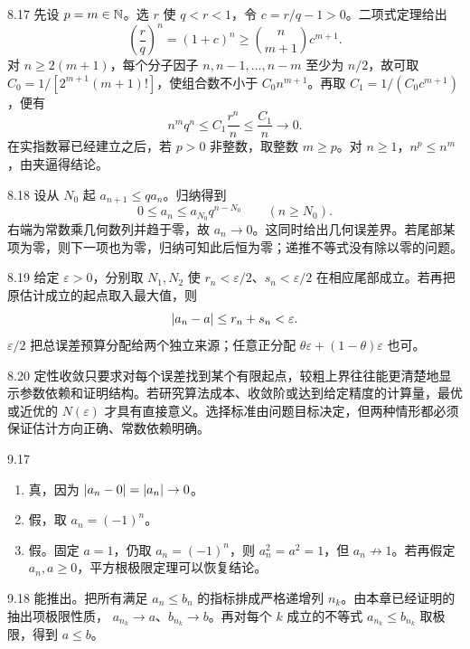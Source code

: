 \begin{solution}{8.17}
先设 \(p=m\in\mathbb{N}\)。选 \(r\) 使 \(q<r<1\)，令 \(c=r/q-1>0\)。二项式定理给出
\[
 \left(\frac rq\right)^n=(1+c)^n
 \ge\binom n{m+1}c^{m+1}.
\]
对 \(n\ge2(m+1)\)，每个分子因子 \(n,n-1,\ldots,n-m\) 至少为 \(n/2\)，故可取 \(C_0=1/[2^{m+1}(m+1)!]\)，使组合数不小于 \(C_0n^{m+1}\)。再取 \(C_1=1/(C_0c^{m+1})\)，便有
\[
 n^mq^n\le C_1\frac{r^n}{n}\le\frac{C_1}{n}\to0.
\]
在实指数幂已经建立之后，若 \(p>0\) 非整数，取整数 \(m\ge p\)。对 \(n\ge1\)，\(n^p\le n^m\)，由夹逼得结论。
\end{solution}

\begin{solution}{8.18}
设从 \(N_0\) 起 \(a_{n+1}\le qa_n\)。归纳得到
\[
 0\le a_n\le a_{N_0}q^{n-N_0}\qquad(n\ge N_0).
\]
右端为常数乘几何数列并趋于零，故 \(a_n\to0\)。这同时给出几何误差界。若尾部某项为零，则下一项也为零，归纳可知此后恒为零；递推不等式没有除以零的问题。
\end{solution}

\begin{solution}{8.19}
给定 \(\varepsilon>0\)，分别取 \(N_1,N_2\) 使
\(r_n<\varepsilon/2\)、\(s_n<\varepsilon/2\) 在相应尾部成立。若再把原估计成立的起点取入最大值，则
\[
 \left|a_n-a\right|\le r_n+s_n<\varepsilon.
\]
\(\varepsilon/2\) 把总误差预算分配给两个独立来源；任意正分配 \(\theta\varepsilon+(1-\theta)\varepsilon\) 也可。
\end{solution}

\begin{solution}{8.20}
定性收敛只要求对每个误差找到某个有限起点，较粗上界往往能更清楚地显示参数依赖和证明结构。若研究算法成本、收敛阶或达到给定精度的计算量，最优或近优的 \(N(\varepsilon)\) 才具有直接意义。选择标准由问题目标决定，但两种情形都必须保证估计方向正确、常数依赖明确。
\end{solution}

\begin{solution}{9.17}
\begin{enumerate}[label=(\arabic*)]
 \item 真，因为 \(\left|a_n-0\right|=\left|a_n\right|\to0\)。
 \item 假，取 \(a_n=(-1)^n\)。
 \item 假。固定 \(a=1\)，仍取 \(a_n=(-1)^n\)，则 \(a_n^2=a^2=1\)，但 \(a_n\not\to1\)。若再假定 \(a_n,a\ge0\)，平方根极限定理可以恢复结论。
\end{enumerate}
\end{solution}

\begin{solution}{9.18}
能推出。把所有满足 \(a_n\le b_n\) 的指标排成严格递增列 \(n_k\)。由本章已经证明的抽出项极限性质，
\(a_{n_k}\to a\)、\(b_{n_k}\to b\)。再对每个 \(k\) 成立的不等式 \(a_{n_k}\le b_{n_k}\) 取极限，得到 \(a\le b\)。
\end{solution}

